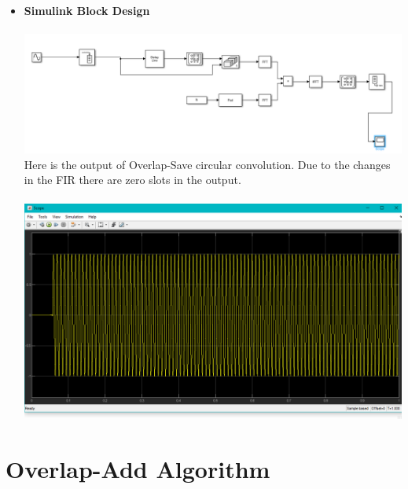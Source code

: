 \documentclass[12pt,a4paper]{article}
\begin{document}
\begin{itemize}
\newpage
\item \textbf {Simulink Block Design}{\\}{\\}
\includegraphics[width=\textwidth]{Photos/overlap save BD.png}
{Here is the output of Overlap-Save circular convolution. Due to the changes in the FIR there are zero slots in the output.\\ \\}
\newline
\includegraphics[width=\textwidth]{Photos/overlap save.png}
\end{itemize}
\newpage
\section*{Overlap-Add Algorithm}
\end{document}
